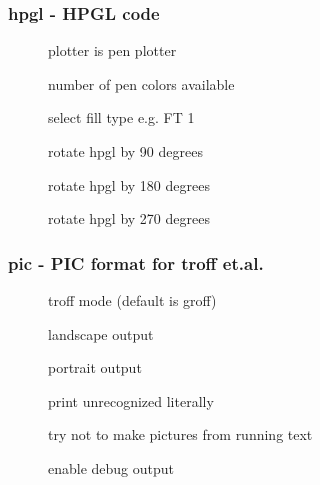 \documentclass[english,a4paper]{article}
\begin{document}
\subsubsection{hpgl - HPGL code}
\begin{description}
\item[] 
plotter is pen plotter


\item[] 
number of pen colors available


\item[] 
select fill type e.g. FT 1


\item[] 
rotate hpgl by 90 degrees


\item[] 
rotate hpgl by 180 degrees


\item[] 
rotate hpgl by 270 degrees


\end{description}
\subsubsection{pic - PIC format for troff et.al.}
\begin{description}
\item[] 
troff mode (default is groff)


\item[] 
landscape output


\item[] 
portrait output


\item[] 
print unrecognized literally


\item[] 
try not to make pictures from running text


\item[] 
enable debug output


\end{description}
\end{document}
